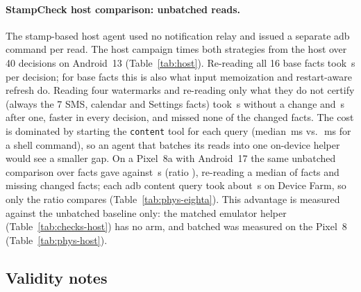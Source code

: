 \paragraph{StampCheck host comparison: unbatched reads.} The stamp-based host agent used no notification relay and issued a separate adb command per read. The host campaign times both strategies from the host over 40 decisions on Android~13 (Table~\ref{tab:host}). Re-reading all 16 base facts took \HostNoneGl\,s per decision; for base facts this is also what input memoization and restart-aware refresh do. Reading four watermarks and re-reading only what they do not certify (always the 7 SMS, calendar and Settings facts) took \HostNoneEv\,s without a change and \HostChgEv\,s after one, faster in every decision, and missed none of the \HostChgChanged changed facts. The cost is dominated by starting the \texttt{content} tool for each query (median \HostQueryMs\,ms vs.\ \HostShellMs\,ms for a shell command), so an agent that batches its reads into one on-device helper would see a smaller gap. On a Pixel~8a with Android~17 the same unbatched comparison over \PhysEightAHostFacts facts gave \PhysEightAHostEvS against \PhysEightAHostGlS\,s (ratio \PhysEightAHostRatio), re-reading a median of \PhysEightAHostReread facts and missing \PhysEightAHostMissed changed facts; each adb content query took about \PhysEightAHostQueryS\,s on Device Farm, so only the ratio compares (Table~\ref{tab:phys-eighta}). This advantage is measured against the unbatched baseline only: the matched emulator helper (Table~\ref{tab:checks-host}) has no \stamp arm, and batched \stamp was measured on the Pixel~8 (Table~\ref{tab:phys-host}).



\subsection{Validity notes}
\label{sec:eval-validity}

